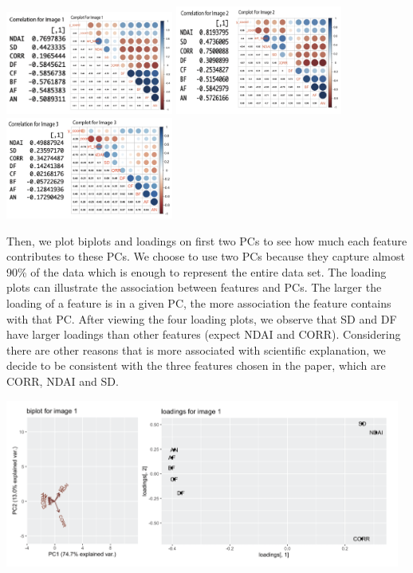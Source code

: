 \documentclass[11pt]{article}
\begin{document}
\includegraphics[width = 5.5cm]{2(c)image1.png}
\includegraphics[width = 5.5cm]{2(c)image2.png}
\includegraphics[width = 5.5cm]{2(c)image3.png}

Then, we plot biplots and loadings on first two PCs to see how much each feature contributes to these PCs. We choose to use two PCs because they capture almost 90\% of the data which is enough to represent the entire data set. The loading plots can illustrate the association between features and PCs. The larger the loading of a feature is in a given PC, the more association the feature contains with that PC. After viewing the four loading plots, we observe that SD and DF have larger loadings than other features (expect NDAI and CORR). Considering there are other reasons that is more associated with scientific explanation, we decide to be consistent with the three features chosen in the paper, which are CORR, NDAI and SD.


\includegraphics[width = 13cm]{2(c)pca1.png}
\end{document}
